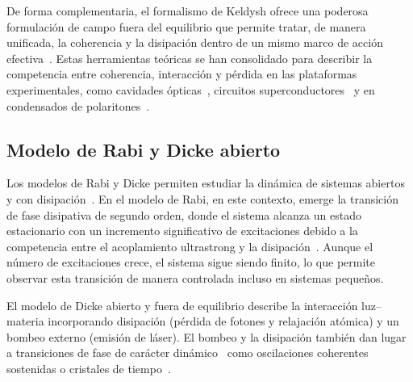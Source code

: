 \documentclass[onecolumn,notitlepage,letterpaper,aps,pra,12pt]{article}
\numberwithin{equation}{section}
\begin{document}
De forma complementaria, el formalismo de Keldysh ofrece una poderosa formulación de campo fuera del equilibrio que permite tratar, de manera unificada, la coherencia y la disipación dentro de un mismo marco de acción efectiva~\cite{Sieberer2016,chakraborty2018,Fazio2025}. Estas herramientas teóricas se han consolidado para describir la competencia entre coherencia, interacción y pérdida en las plataformas experimentales, como cavidades ópticas~\cite{torres2013}, circuitos superconductores~\cite{feigelman2000} y en condensados de polaritones~\cite{dunnet2016}.


\subsection{Modelo de Rabi y Dicke abierto}

Los modelos de Rabi y Dicke permiten estudiar la dinámica de sistemas abiertos y con disipación~\cite{henriet2014,hwang2018,zueco2019,Lyu2024,damanet2019,Grimsmo2013}. En el modelo de Rabi, en este contexto, emerge la transición de fase disipativa de segundo orden, donde el sistema alcanza un estado estacionario con un incremento significativo de excitaciones debido a la competencia entre el acoplamiento ultrastrong y la disipación~\cite{hwang2018}. Aunque el número de excitaciones crece, el sistema sigue siendo finito, lo que permite observar esta transición de manera controlada incluso en sistemas pequeños.

El modelo de Dicke abierto y fuera de equilibrio describe la interacción luz–materia incorporando disipación (pérdida de fotones y relajación atómica) y un bombeo externo (emisión de láser). El bombeo y la disipación también dan lugar a transiciones de fase de carácter dinámico~\cite{kirton2017,LeBoite2020} como oscilaciones coherentes~\cite{mivehvar2021} sostenidas o cristales de tiempo~\cite{zhu2019}.
\end{document}
